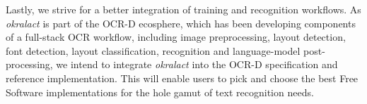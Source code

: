 \documentclass[conference]{IEEEtran}
\begin{document}


Lastly, we strive for a better integration of training and
recognition workflows. As \textit{okralact} is part of the OCR-D
ecosphere, which has been developing components of a full-stack
OCR workflow, including image preprocessing, layout detection, font
detection, layout classification, recognition and language-model
post-processing, we intend to integrate \textit{okralact} into the
OCR-D specification and reference implementation. This will enable
users to pick and choose the best Free Software implementations for
the hole gamut of text recognition needs.




%
%
%



\end{document}
